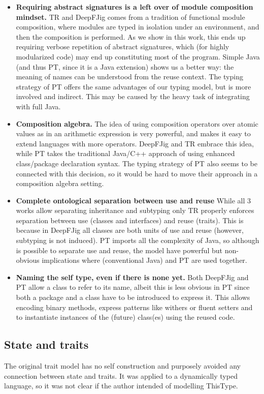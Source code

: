 \begin{itemize}
\item 
{\bf Requiring abstract signatures is a left over of module composition mindset.}
TR and DeepFJig comes from a tradition of functional module composition, where 
modules are typed in isolation under an environment, and then the composition is performed.
As we show in this work, this ends up requiring verbose repetition of abstract signatures,
which (for highly modularized code) may end up constituting most of the program.
Simple Java (and thus PT, since it is a Java extension) shows us a better way:
the meaning of names can be understood from the reuse context.
The typing strategy of PT offers the same advantages of our typing model, 
but is more involved and indirect. This may be caused by the
heavy task of integrating with full Java.
\item {\bf Composition algebra.}
The idea of using composition operators over atomic values as in an arithmetic expression is very powerful,
and makes it easy to extend languages with more operators. DeepFJig and TR embrace this idea, while PT takes the traditional Java/C++ approach of using enhanced class/package declaration syntax.
The typing strategy of PT also seems to be connected with this
decision, so it would be hard to move their approach in a composition
algebra setting.
\item {\bf Complete ontological separation between use and reuse}
While all 3 works allow separating inheritance and subtyping only TR properly enforces 
separation between use (classes and interfaces) and reuse (traits).
This is because in DeepFJig all classes are both units of use and reuse (however, subtyping is not induced).
PT imports all the complexity of Java, so although is possible to separate use and reuse, the model have powerful but non-obvious implications where (conventional Java) \Q@extends@ and PT are used together.
\item {\bf Naming the self type, even if there is none yet.}
Both DeepFJig and PT allow a class to refer to its name, albeit this is
less obvious in PT since both a package and a class have to be introduced to express it.
This allows encoding binary methods, express patterns like withers or fluent setters and to instantiate instances of the (future) class(es)  using the reused code.

\end{itemize}

\subsection{State and traits}
The original trait model has no self construction 
and purposely avoided any connection between state and traits.
It was applied to a dynamically typed language, so
it was not clear if the author intended of modelling ThisType.


